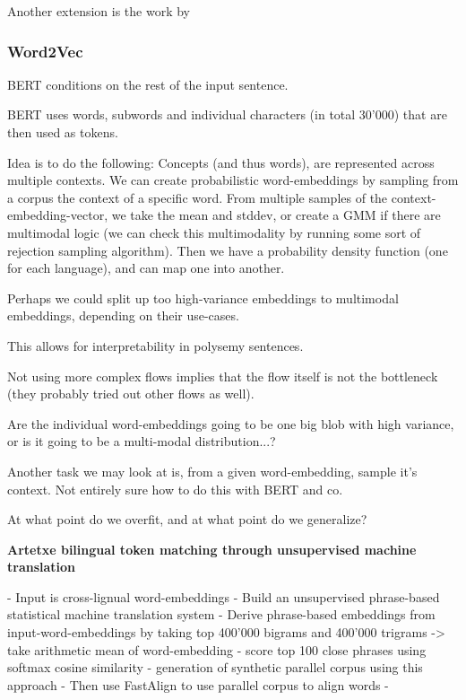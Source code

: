 \documentclass[a4paper,12pt,twoside,openright]{report}
\begin{document}
Another extension is the work by  


\newpage
\subsubsection{Word2Vec}

BERT conditions on the rest of the input sentence.

BERT uses words, subwords and individual characters (in total 30'000) that are then used as tokens.

Idea is to do the following:
Concepts (and thus words), are represented across multiple contexts.
We can create probabilistic word-embeddings by sampling from a corpus the context of a specific word.
From multiple samples of the context-embedding-vector, we take the mean and stddev, or create a GMM if there are multimodal logic (we can check this multimodality by running some sort of rejection sampling algorithm).
Then we have a probability density function (one for each language), and can map one into another.

Perhaps we could split up too high-variance embeddings to multimodal embeddings, depending on their use-cases.

This allows for interpretability in polysemy sentences.

Not using more complex flows implies that the flow itself is not the bottleneck (they probably tried out other flows as well).

Are the individual word-embeddings going to be one big blob with high variance, or is it going to be a multi-modal distribution...?

Another task we may look at is, from a given word-embedding, sample it's context. 
Not entirely sure how to do this with BERT and co.

At what point do we overfit, and at what point do we generalize?


\textbf{Artetxe bilingual token matching through unsupervised machine translation}

- Input is cross-lignual word-embeddings
- Build an unsupervised phrase-based statistical machine translation system
- Derive phrase-based embeddings from input-word-embeddings by taking top 400'000 bigrams and 400'000 trigrams -> take arithmetic mean of word-embedding
- score top 100 close phrases using softmax cosine similarity
- generation of synthetic parallel corpus using this approach
- Then use FastAlign to use parallel corpus to align words
- 
\end{document}
